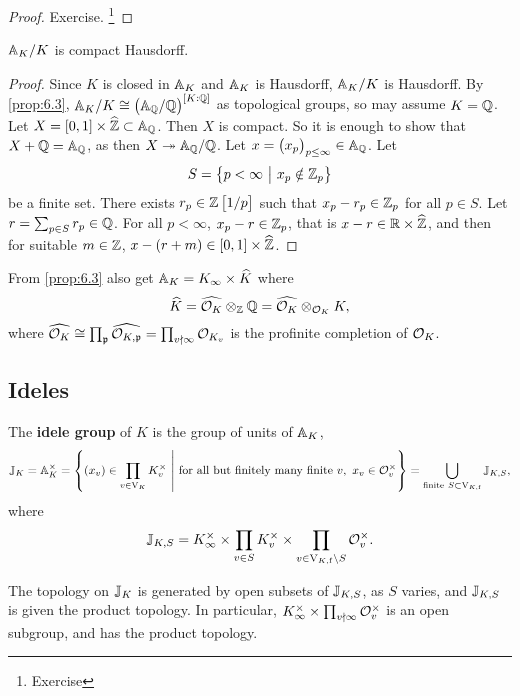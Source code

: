 \begin{proof}
Exercise. \footnote{Exercise}
\end{proof}

\begin{theorem}
$ \AA_K / K $ is compact Hausdorff.
\end{theorem}

\begin{proof}
Since $ K $ is closed in $ \AA_K $ and $ \AA_K $ is Hausdorff, $ \AA_K / K $ is Hausdorff. By \ref{prop:6.3}, $ \AA_K / K \cong \br{\AA_\QQ / \QQ}^{\sbr{K : \QQ}} $ as topological groups, so may assume $ K = \QQ $. Let $ X = \sbr{0, 1} \times \widehat{\ZZ} \subset \AA_\QQ $. Then $ X $ is compact. So it is enough to show that $ X + \QQ = \AA_\QQ $, as then $ X \twoheadrightarrow \AA_\QQ / \QQ $. Let $ x = \br{x_p}_{p \le \infty} \in \AA_\QQ $. Let
$$ S = \cbr{p < \infty \st x_p \notin \ZZ_p} $$
be a finite set. There exists $ r_p \in \ZZ\sbr{1 / p} $ such that $ x_p - r_p \in \ZZ_p $ for all $ p \in S $. Let $ r = \sum_{p \in S} r_p \in \QQ $. For all $ p < \infty $, $ x_p - r \in \ZZ_p $, that is $ x - r \in \RR \times \widehat{\ZZ} $, and then for suitable $ m \in \ZZ $, $ x - \br{r + m} \in \sbr{0, 1} \times \widehat{\ZZ} $.
\end{proof}

From \ref{prop:6.3} also get $ \AA_K = K_\infty \times \widehat{K} $ where
$$ \widehat{K} = \widehat{\OOO_K} \otimes_\ZZ \QQ = \widehat{\OOO_K} \otimes_{\OOO_K} K, $$
where $ \widehat{\OOO_K} \cong \prod_\ppp \widehat{\OOO_{K, \ppp}} = \prod_{v \nmid \infty} \OOO_{K_v} $ is the profinite completion of $ \OOO_K $.

\subsection{Ideles}

\begin{definition*}
The \textbf{idele group} of $ K $ is the group of units of $ \AA_K $,
$$ \JJ_K = \AA_K^\times = \cbr{\br{x_v} \in \prod_{v \in \V_K} K_v^\times \st \text{for all but finitely many finite} \ v, \ x_v \in \OOO_v^\times} = \bigcup_{\text{finite} \ S \subset \V_{K, \f}} \JJ_{K, S}, $$
where
$$ \JJ_{K, S} = K_\infty^\times \times \prod_{v \in S} K_v^\times \times \prod_{v \in \V_{K, \f} \setminus S} \OOO_v^\times. $$
\end{definition*}

The topology on $ \JJ_K $ is generated by open subsets of $ \JJ_{K, S} $, as $ S $ varies, and $ \JJ_{K, S} $ is given the product topology. In particular, $ K_\infty^\times \times \prod_{v \nmid \infty} \OOO_v^\times $ is an open subgroup, and has the product topology.


